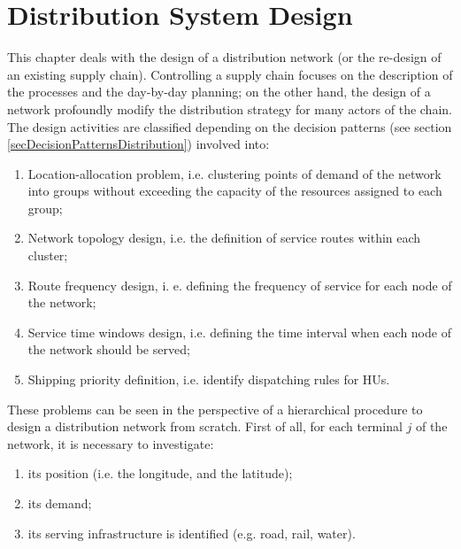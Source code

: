 \chapter{Distribution System Design} \label{chapDistDesign}

This chapter deals with the design of a distribution network (or the re-design of an existing supply chain). Controlling a supply chain focuses on the description of the processes and the day-by-day planning; on the other hand, the design of a network profoundly modify the distribution strategy for many actors of the chain. The design activities are classified depending on the decision patterns (see section \ref{secDecisionPatternsDistribution}) involved into:

\begin{enumerate}
    \item Location-allocation problem, i.e. clustering points of demand of the network into groups without exceeding the capacity of the resources assigned to each group;
    \item Network topology design, i.e. the definition of service routes within each cluster;
    \item Route frequency design, i. e. defining the frequency of service for each node of the network;
    \item Service time windows design, i.e. defining the time interval when each node of the network should be served;
    \item Shipping priority definition, i.e. identify dispatching rules for HUs.

\end{enumerate}

These problems can be seen in the perspective of a hierarchical procedure to design a distribution network from scratch. First of all, for each terminal $j$ of the network, it is necessary to investigate:

\begin{enumerate}
    \item its position (i.e. the longitude, and the latitude);
    \item its demand;
    \item its serving infrastructure is identified (e.g. road, rail, water).
\end{enumerate}


